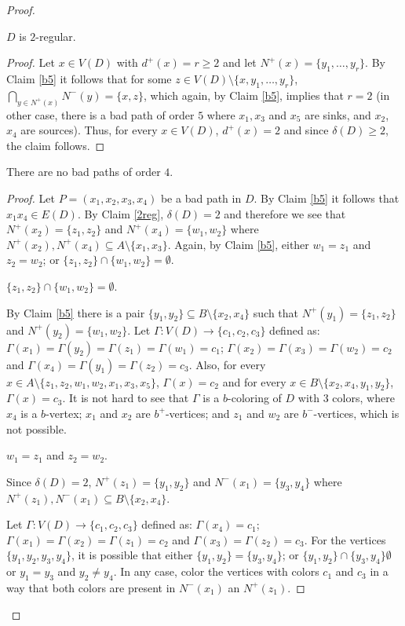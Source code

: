 \documentclass[10pt,a4paper]{amsart}
\begin{document}
\begin{proof}
\begin{claim}\label{2reg} $D$ is $2$-regular.
\end{claim}
\begin{proof} Let $x\in V(D)$ with $d^+(x) =r\geq 2$ and let $N^+(x) = \{y_1, \dots, y_r\}$. By Claim \ref{b5} it follows that for some $z\in V(D)\setminus \{x, y_1, \dots, y_r\}$,  $\bigcap\limits_{y\in N^+(x)} N^-(y) = \{x, z\}$, which again, by Claim \ref{b5}, implies that $r=2$ (in other case, there is a bad path of order $5$ where $x_1, x_3$ and $x_5$ are sinks, and $x_2$, $x_4$ are sources). Thus, for every $x\in V(D)$, $d^+(x) =2$ and since $\delta(D) \geq 2$, the claim follows.
\end{proof}

\begin{claim}\label{b4} There are no bad paths of order $4$.
\end{claim}
\begin{proof}
Let $P=(x_1, x_2, x_3, x_4)$ be a bad path in $D$. By Claim \ref{b5} it follows that $x_1x_4\in E(D)$. By Claim \ref{2reg}, $\delta(D) = 2$ and therefore we see that $N^+(x_2) = \{z_1, z_2\}$ and $N^+(x_4) = \{w_1, w_2\}$ where $N^+(x_2), N^+(x_4) \subseteq A\setminus\{x_1, x_3\}$. Again, by Claim \ref{b5}, either $w_1= z_1$ and $z_2=w_2$;  or $\{z_1, z_2\}\cap \{w_1, w_2\}=\emptyset$. 

 $\{z_1, z_2\}\cap \{w_1, w_2\}=\emptyset$.

\noindent By Claim \ref{b5} there is a pair  $\{y_1, y_2\}\subseteq B\setminus \{x_2, x_4\}$ such that $N^+(y_1) = \{z_1, z_2\}$ and $N^+(y_2) = \{w_1, w_2\}$. Let $\Gamma: V(D) \rightarrow \{c_1, c_2, c_3\}$ defined as: $\Gamma(x_1) =\Gamma(y_2) = \Gamma(z_1) = \Gamma(w_1) = c_1$; $\Gamma(x_2)  = \Gamma(x_3)  = \Gamma(w_2) = c_2$ and $\Gamma(x_4) = \Gamma(y_1) = \Gamma(z_2) = c_3$.  Also, for every $x\in A\setminus\{z_1, z_2, w_1, w_2, x_1, x_3, x_5\}$, $\Gamma(x) = c_2$ and for every $x\in B\setminus\{x_2, x_4, y_1, y_2\}$, $\Gamma(x) = c_3$. It is not hard to see that $\Gamma$ is a $b$-coloring of $D$ with 3 colors, where  $x_4$ is a  $b$-vertex;  $x_1$ and $x_2$ are $b^+$-vertices; and $z_1$ and $w_2$  are $b^-$-vertices, which is not possible.

 $w_1= z_1$ and $z_2=w_2$.

\noindent Since $\delta(D) = 2$, $N^+(z_1)= \{y_1, y_2\}$ and $N^-(x_1)= \{y_3, y_4\}$ where $N^+(z_1), N^-(x_1) \subseteq B\setminus \{x_2, x_4\}$. 

Let $\Gamma: V(D) \rightarrow \{c_1, c_2, c_3\}$ defined as: $\Gamma(x_4)  = c_1$; $\Gamma(x_1)  = \Gamma(x_2)  = \Gamma(z_1) = c_2$ and $\Gamma(x_3) = \Gamma(z_2) = c_3$.  For the vertices $\{y_1, y_2, y_3, y_4\}$, it is possible that either $\{y_1,y_2\}= \{y_3, y_4\}$; or $\{y_1,y_2\}\cap \{y_3, y_4\}\emptyset$ or $y_1=y_3$ and $y_2\not=y_4$. In any case, color the vertices with colors $c_1$ and $c_3$ in a way that both colors are present in $N^-(x_1)$ an $N^+(z_1)$. 


\end{proof}
\end{proof}
\end{document}
